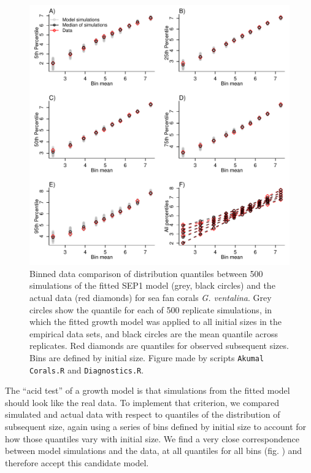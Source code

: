 \documentclass[11pt]{article}
\begin{document}
{\begin{figure}[tbp]
\centering
\includegraphics[width=.95\textwidth]{figures/CoralQuantileComparePlot.pdf}
\caption{Binned data comparison of distribution quantiles between 500 simulations of the fitted SEP1 model (grey, black circles) and the 
actual data (red diamonds) for sea fan corals \emph{G. ventalina}. Grey circles show the quantile for each of 500 replicate simulations,
in which the fitted growth model was applied to all initial sizes in the empirical data sets, and black circles are the mean
quantile across replicates. Red diamonds are quantiles for observed subsequent sizes. Bins are defined by initial size. Figure
made by scripts \texttt{Akumal Corals.R} and \texttt{Diagnostics.R}.}
\label{fig:CoralQuantileCompare}
\end{figure} 


The ``acid test'' of a growth model is that simulations from the fitted model should look like the real data. 
To implement that criterion, we compared simulated and actual data with respect to quantiles of the distribution
of subsequent size, again using a series of bins defined by initial size to account for how those quantiles vary
with initial size. We find a very close correspondence between model simulations and the data, at all quantiles for all bins
(fig. ) and therefore accept this candidate model. 
 

}
\end{document}
